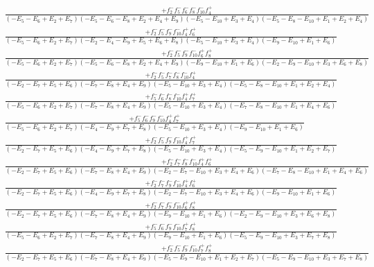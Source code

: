 \documentclass{article}
\begin{document}
\[\begin{array}{rcl}
\frac{+f_{2}^{-}f_{5}^{-}f_{6}^{-}f_{8}^{-}f_{10}^{-}f_{4}^{+}}{(-E_{5}-E_{6}+E_{2}+E_{7})(-E_{5}-E_{6}-E_{8}+E_{2}+E_{4}+E_{9})(-E_{5}-E_{10}+E_{3}+E_{4})(-E_{5}-E_{8}-E_{10}+E_{1}+E_{2}+E_{4})}\\
\frac{+f_{2}^{-}f_{5}^{-}f_{9}^{-}f_{10}^{-}f_{4}^{+}f_{6}^{+}}{(-E_{5}-E_{6}+E_{2}+E_{7})(-E_{2}-E_{4}-E_{9}+E_{5}+E_{6}+E_{8})(-E_{5}-E_{10}+E_{3}+E_{4})(-E_{9}-E_{10}+E_{1}+E_{6})}\\
\frac{+f_{2}^{-}f_{5}^{-}f_{9}^{-}f_{10}^{-}f_{6}^{+}f_{8}^{+}}{(-E_{5}-E_{6}+E_{2}+E_{7})(-E_{5}-E_{6}-E_{8}+E_{2}+E_{4}+E_{9})(-E_{9}-E_{10}+E_{1}+E_{6})(-E_{2}-E_{9}-E_{10}+E_{3}+E_{6}+E_{8})}\\
\frac{+f_{2}^{-}f_{5}^{-}f_{7}^{-}f_{8}^{-}f_{10}^{-}f_{4}^{+}}{(-E_{2}-E_{7}+E_{5}+E_{6})(-E_{7}-E_{8}+E_{4}+E_{9})(-E_{5}-E_{10}+E_{3}+E_{4})(-E_{5}-E_{8}-E_{10}+E_{1}+E_{2}+E_{4})}\\
\frac{+f_{5}^{-}f_{6}^{-}f_{8}^{-}f_{10}^{-}f_{4}^{+}f_{7}^{+}}{(-E_{5}-E_{6}+E_{2}+E_{7})(-E_{7}-E_{8}+E_{4}+E_{9})(-E_{5}-E_{10}+E_{3}+E_{4})(-E_{7}-E_{8}-E_{10}+E_{1}+E_{4}+E_{6})}\\
\frac{+f_{5}^{-}f_{6}^{-}f_{9}^{-}f_{10}^{-}f_{4}^{+}f_{7}^{+}}{(-E_{5}-E_{6}+E_{2}+E_{7})(-E_{4}-E_{9}+E_{7}+E_{8})(-E_{5}-E_{10}+E_{3}+E_{4})(-E_{9}-E_{10}+E_{1}+E_{6})}\\
\frac{+f_{2}^{-}f_{5}^{-}f_{9}^{-}f_{10}^{-}f_{4}^{+}f_{7}^{+}}{(-E_{2}-E_{7}+E_{5}+E_{6})(-E_{4}-E_{9}+E_{7}+E_{8})(-E_{5}-E_{10}+E_{3}+E_{4})(-E_{5}-E_{9}-E_{10}+E_{1}+E_{2}+E_{7})}\\
\frac{+f_{2}^{-}f_{7}^{-}f_{8}^{-}f_{10}^{-}f_{4}^{+}f_{6}^{+}}{(-E_{2}-E_{7}+E_{5}+E_{6})(-E_{7}-E_{8}+E_{4}+E_{9})(-E_{2}-E_{7}-E_{10}+E_{3}+E_{4}+E_{6})(-E_{7}-E_{8}-E_{10}+E_{1}+E_{4}+E_{6})}\\
\frac{+f_{2}^{-}f_{7}^{-}f_{9}^{-}f_{10}^{-}f_{4}^{+}f_{6}^{+}}{(-E_{2}-E_{7}+E_{5}+E_{6})(-E_{4}-E_{9}+E_{7}+E_{8})(-E_{2}-E_{7}-E_{10}+E_{3}+E_{4}+E_{6})(-E_{9}-E_{10}+E_{1}+E_{6})}\\
\frac{+f_{2}^{-}f_{7}^{-}f_{9}^{-}f_{10}^{-}f_{6}^{+}f_{8}^{+}}{(-E_{2}-E_{7}+E_{5}+E_{6})(-E_{7}-E_{8}+E_{4}+E_{9})(-E_{9}-E_{10}+E_{1}+E_{6})(-E_{2}-E_{9}-E_{10}+E_{3}+E_{6}+E_{8})}\\
\frac{+f_{5}^{-}f_{6}^{-}f_{9}^{-}f_{10}^{-}f_{7}^{+}f_{8}^{+}}{(-E_{5}-E_{6}+E_{2}+E_{7})(-E_{7}-E_{8}+E_{4}+E_{9})(-E_{9}-E_{10}+E_{1}+E_{6})(-E_{5}-E_{9}-E_{10}+E_{3}+E_{7}+E_{8})}\\
\frac{+f_{2}^{-}f_{5}^{-}f_{9}^{-}f_{10}^{-}f_{7}^{+}f_{8}^{+}}{(-E_{2}-E_{7}+E_{5}+E_{6})(-E_{7}-E_{8}+E_{4}+E_{9})(-E_{5}-E_{9}-E_{10}+E_{1}+E_{2}+E_{7})(-E_{5}-E_{9}-E_{10}+E_{3}+E_{7}+E_{8})}\\

\end{array}\]
\end{document}
